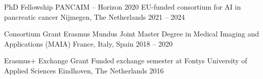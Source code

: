 

\begin{cvhonors}

  \cvhonor
    {PhD Fellowship} %
    {PANCAIM -- Horizon 2020 EU-funded consortium for AI in pancreatic cancer} %
    {Nijmegen, The Netherlands} %
    {2021 -- 2024} %

  \cvhonor
    {Consortium Grant} %
    {Erasmus Mundus Joint Master Degree in Medical Imaging and Applications (MAIA)} %
    {France, Italy, Spain} %
    {2018 -- 2020} %

  \cvhonor
    {Erasmus+ Exchange Grant} %
    {Funded exchange semester at Fontys University of Applied Sciences} %
    {Eindhoven, The Netherlands} %
    {2016} %

\end{cvhonors}
